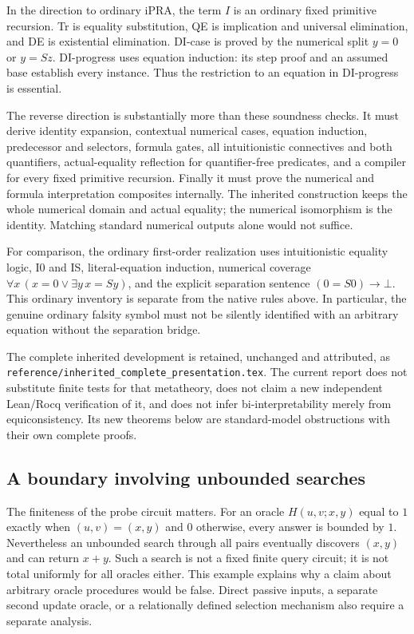 \documentclass[11pt]{article}
\newcommand{\file}[1]{\texttt{\nolinkurl{#1}}}
\begin{document}
In the direction to ordinary iPRA, the term $I$ is an ordinary fixed
primitive recursion. Tr is equality substitution, QE is implication and
universal elimination, and DE is existential elimination. DI-case is
proved by the numerical split $y=0$ or $y=Sz$. DI-progress uses equation
induction: its step proof and an assumed base establish every instance.
Thus the restriction to an equation in DI-progress is essential.

The reverse direction is substantially more than these soundness checks.
It must derive identity expansion, contextual numerical cases, equation
induction, predecessor and selectors, formula gates, all intuitionistic
connectives and both quantifiers, actual-equality reflection for
quantifier-free predicates, and a compiler for every fixed primitive
recursion. Finally it must prove the numerical and formula interpretation
composites internally. The inherited construction keeps the whole
numerical domain and actual equality; the numerical isomorphism is the
identity. Matching standard numerical outputs alone would not suffice.

For comparison, the ordinary first-order realization uses intuitionistic
equality logic, I0 and IS, literal-equation induction, numerical coverage
$\forall x\,(x=0\lor\exists y\,x=Sy)$, and the explicit separation
sentence $(0=S0)\to\bot$. This ordinary inventory is separate from the
native rules above. In particular, the genuine ordinary falsity symbol
must not be silently identified with an arbitrary equation without the
separation bridge.

The complete inherited development is retained, unchanged and attributed,
as \file{reference/inherited_complete_presentation.tex}. The current
report does not substitute finite tests for that metatheory, does not
claim a new independent Lean/Rocq verification of it, and does not infer
bi-interpretability merely from equiconsistency. Its new theorems below
are standard-model obstructions with their own complete proofs.



\subsection{A boundary involving unbounded searches}

The finiteness of the probe circuit matters. For an oracle
$H(u,v;x,y)$ equal to $1$ exactly when $(u,v)=(x,y)$ and $0$ otherwise,
every answer is bounded by $1$. Nevertheless an unbounded search through
all pairs eventually discovers $(x,y)$ and can return $x+y$. Such a
search is not a fixed finite query circuit; it is not total uniformly for
all oracles either. This example explains why a claim about arbitrary
oracle procedures would be false. Direct passive inputs, a separate
second update oracle, or a relationally defined selection mechanism also
require a separate analysis.
\end{document}
